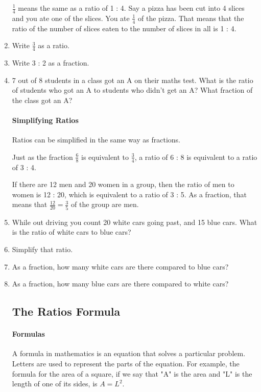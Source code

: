 \documentclass{article}
\begin{document}
\begin{spacing}{1.25}
\begin{enumerate}
$\frac{1}{4}$ means the same as a ratio of 1 : 4. Say a pizza has been cut into 4 slices and you ate one of the slices. You ate $\frac{1}{4}$ of the pizza. That means that the ratio of the number of slices eaten to the number of slices in all is 1 : 4.

\item Write $\frac{3}{4}$ as a ratio.
\item Write 3 : 2 as a fraction.
\item 7 out of 8 students in a class got an A on their maths test. What is the ratio of students who got an A to students who didn't get an A? What fraction of the class got an A?\\

\paragraph{Simplifying Ratios}
Ratios can be simplified in the same way as fractions.

Just as the fraction $\frac{6}{8}$ is equivalent to $\frac{3}{4}$, a ratio of 6 : 8 is equivalent to a ratio of 3 : 4.

If there are 12 men and 20 women in a group, then the ratio of men to women is 12 : 20, which is equivalent to a ratio of 3 : 5. As a fraction, that means that $\frac{12}{20} = \frac{3}{5}$ of the group are men.\\

\item While out driving you count 20 white cars going past, and 15 blue cars. What is the ratio of white cars to blue cars?
\item Simplify that ratio.
\item As a fraction, how many white cars are there compared to blue cars?
\item As a fraction, how many blue cars are there compared to white cars?

\subsection*{The Ratios Formula}

\paragraph{Formulas}
A formula in mathematics is an equation that solves a particular problem. Letters are used to represent the parts of the equation. For example, the formula for the area of a square, if we say that "A" is the area and "L" is the length of one of its sides, is $A = L^2$.\\


\end{enumerate}
\end{spacing}
\end{document}
